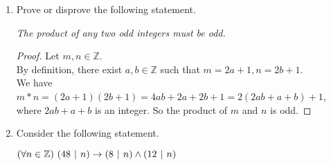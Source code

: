 \documentclass[12pt]{amsart}
\renewcommand*\divides{\hspace{0.05in}|\hspace{0.05in}}
\begin{document}
\begin{enumerate}[{\bfseries 1.}]
	\vspace{0.1in}
	\begin{center}
	\noindent
	\textit{For every integer $n\geq 3$, $n^2-4$ is composite.}
	\end{center}

	\vspace{0.1in}
	\noindent
	Explain why the following ``proof'' fails.  (Do not explain why the statement is false.)
	
	\vspace{0.1in}
	\begin{proof}
	Let $n\geq 3$ be an integer.  Note that we have $n^{2}-4=(n-2)(n+2)$, then $n^{2}-4$ is a product of two integers, which is composite.
	\end{proof}
	\begin{normalize}
    \vspace{0.1in}
    $n\geq 3$ is not a number but a statement so it cannot be fixed as an integer.  
    \\
    \end{normalize}
\vspace{0.2in}
\item Prove or disprove the following statement.

	\vspace{0.1in}
	\begin{center}
	\noindent
	\textit{The product of any two odd integers must be odd.}
	\end{center}
	\begin{normalize}
    \vspace{0.1in}
    \begin{proof}  
    Let $m, n\in\mathbb{Z}$.
    \\By definition, there exist $a, b\in\mathbb{Z}$ such that $m = 2a+1, n = 2b+1$. 
    \\We have $m*n = (2a+1)(2b+1) = 4ab+2a+2b+1 = 2(2ab+a+b)+1$, where $2ab+a+b$ is an integer. So the product of $m$ and $n$ is odd.
    \end{proof}
    \end{normalize}
	\vfill
	\vfill
\newpage
\item Consider the following statement.

	\vspace{0.1in}
	\begin{center}
	\noindent
	\textit{$(\forall n\in\mathbb{Z})\ (48\divides n)\to (8\divides n)\land (12\divides n)$}
	\end{center}


\end{enumerate}
\end{document}
